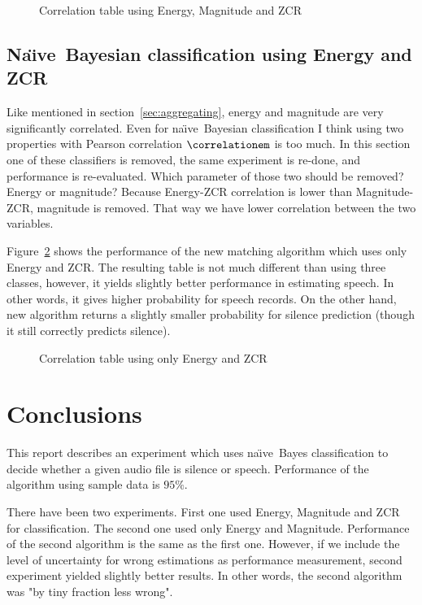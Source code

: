 \documentclass[english,11pt]{article}
\numberwithin{equation}{section}
\newcommand{\naive}{na\"{\i}ve\ }
\newcommand{\Naive}{Na\"{\i}ve\ }
\begin{document}
\begin{figure}
    \centering
    \caption{Correlation table using Energy, Magnitude and ZCR}
    \correlationtableemz
    \label{tab:correlation_table_emz}
\end{figure}

\subsection{\Naive Bayesian classification using Energy and ZCR}
\label{sec:classification_energy_zcr}

Like mentioned in section~\ref{sec:aggregating}, energy and magnitude are very
significantly correlated. Even for \naive Bayesian classification I think using
two properties with Pearson correlation $\correlationem$ is too much. In this
section one of these classifiers is removed, the same experiment is re-done,
and performance is re-evaluated. Which parameter of those two should be
removed? Energy or magnitude? Because Energy-ZCR correlation is lower than
Magnitude-ZCR, magnitude is removed. That way we have lower correlation between
the two variables.

Figure~\ref{tab:correlation_table_ez} shows the performance of the new matching
algorithm which uses only Energy and ZCR. The resulting table is not much
different than using three classes, however, it yields slightly better
performance in estimating speech. In other words, it gives higher probability
for speech records. On the other hand, new algorithm returns a slightly smaller
probability for silence prediction (though it still correctly predicts
silence).

\begin{figure}
    \centering
    \caption{Correlation table using only Energy and ZCR}
    \correlationtableez
    \label{tab:correlation_table_ez}
\end{figure}

\section{Conclusions}

This report describes an experiment which uses \naive Bayes classification
to decide whether a given audio file is silence or speech. Performance of the
algorithm using sample data is $95\%$.

There have been two experiments. First one used Energy, Magnitude and ZCR for
classification. The second one used only Energy and Magnitude. Performance of
the second algorithm is the same as the first one. However, if we include the
level of uncertainty for wrong estimations as performance measurement, second
experiment yielded slightly better results. In other words, the second algorithm
was "by tiny fraction less wrong".
\end{document}
